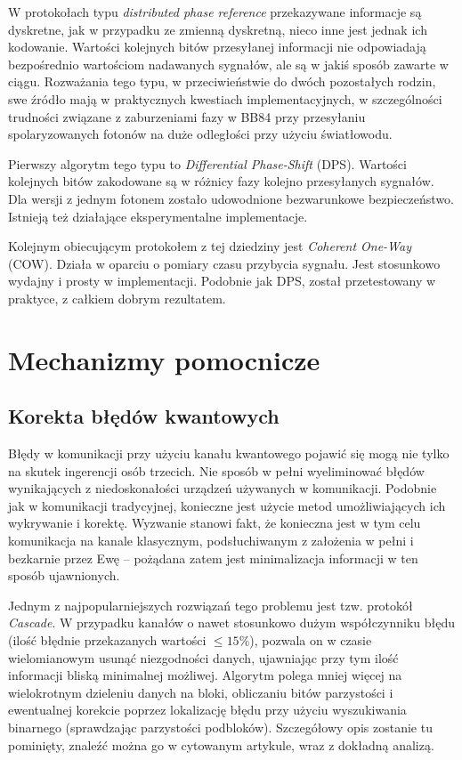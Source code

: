\documentclass[10pt]{article}
\begin{document}
W protokołach typu \emph{distributed phase reference} przekazywane informacje są dyskretne, jak
w przypadku ze zmienną dyskretną, nieco inne jest jednak ich kodowanie. Wartości kolejnych bitów
przesyłanej informacji nie odpowiadają bezpośrednio wartościom nadawanych sygnałów, ale są w jakiś
sposób zawarte w ciągu. Rozważania tego typu, w przeciwieństwie do dwóch pozostałych rodzin,
swe źródło mają w praktycznych kwestiach implementacyjnych, w szczególności trudności związane
z zaburzeniami fazy w BB84 przy przesyłaniu spolaryzowanych fotonów na duże odległości przy
użyciu światłowodu\cite{Liu13}. 

Pierwszy algorytm tego typu to \emph{Differential Phase-Shift} (DPS)\cite{Inoue02}. Wartości
kolejnych bitów zakodowane są w różnicy fazy kolejno przesyłanych sygnałów. Dla wersji z jednym
fotonem zostało udowodnione bezwarunkowe bezpieczeństwo\cite{Wen09}. Istnieją też działające 
eksperymentalne implementacje\cite{Liu13}.

Kolejnym obiecującym protokołem z tej dziedziny jest \emph{Coherent One-Way} (COW)\cite{Stucki05}.
Działa w oparciu o pomiary czasu przybycia sygnału. Jest stosunkowo wydajny i prosty w implementacji.
Podobnie jak DPS, został przetestowany w praktyce, z całkiem dobrym rezultatem\cite{Stucki08}.


\section{Mechanizmy pomocnicze}

\subsection{Korekta błędów kwantowych}

Błędy w komunikacji przy użyciu kanału kwantowego pojawić się mogą nie tylko na skutek ingerencji
osób trzecich. Nie sposób w pełni wyeliminować błędów wynikających z niedoskonałości urządzeń
używanych w komunikacji. Podobnie jak w komunikacji tradycyjnej, konieczne jest użycie metod
umożliwiających ich wykrywanie i korektę. Wyzwanie stanowi fakt, że konieczna jest w tym celu
komunikacja na kanale klasycznym, podsłuchiwanym z założenia w pełni i bezkarnie przez Ewę -- 
pożądana zatem jest minimalizacja informacji w ten sposób ujawnionych.

Jednym z najpopularniejszych rozwiązań tego problemu jest tzw. protokół \emph{Cascade}\cite{Brassard94}.
W przypadku kanałów o nawet stosunkowo dużym współczynniku błędu (ilość błędnie przekazanych wartości
\(\leq 15\%\)), pozwala on w czasie wielomianowym usunąć niezgodności danych, ujawniając przy tym
ilość informacji bliską minimalnej możliwej. Algorytm polega mniej więcej na wielokrotnym dzieleniu 
danych na bloki, obliczaniu bitów parzystości i ewentualnej korekcie poprzez lokalizację błędu przy
użyciu wyszukiwania binarnego (sprawdzając parzystości podbloków). Szczegółowy opis zostanie tu
pominięty, znaleźć można go w cytowanym artykule, wraz z dokładną analizą\cite{Brassard94}.
\end{document}
